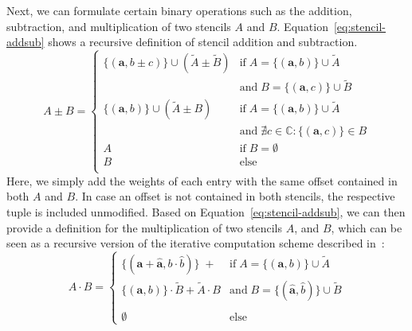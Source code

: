 Next, we can formulate certain binary operations such as the addition, subtraction, and multiplication of two stencils $A$ and $B$.
Equation~\eqref{eq:stencil-addsub} shows a recursive definition of stencil addition and subtraction.
\begin{equation}
	A \pm B = 
	\begin{cases}
		\{(\bm{a}, b\pm c ) \} \cup (\tilde{A} \pm \tilde{B}) & \text{if} \; A = 	\{(\bm{a}, b ) \} \cup \tilde{A} \\
		& \text{and} \; B = \{(\bm{a}, c ) \} \cup \tilde{B} \\
		
		\{(\bm{a}, b ) \} \cup (\tilde{A} \pm B) & \text{if} \; A = 	\{(\bm{a}, b ) \} \cup \tilde{A} \\
		& \text{and} \; \nexists  c \in \mathbb{C} : \{(\bm{a}, c ) \} \in B 
		\\
		A & \text{if} \; B = \emptyset
		\\
		B & \text{else} 
		\\
	\end{cases}
\label{eq:stencil-addsub}
\end{equation}
Here, we simply add the weights of each entry with the same offset contained in both $A$ and $B$.
In case an offset is not contained in both stencils, the respective tuple is included unmodified.  
Based on Equation~\eqref{eq:stencil-addsub}, we can then provide a definition for the multiplication of two stencils $A$, and $B$, which can be seen as a recursive version of the iterative computation scheme described in~\cite{rittich2018extending}:
\begin{equation}
	A \cdot B = 
	\begin{cases}
		\{(\bm{a} + \bm{\hat{a}}, b \cdot \hat{b} ) \} \; + & \text{if} \; A = \{(\bm{a}, b ) \} \cup \tilde{A} \\
		\{(\bm{a}, b ) \} \cdot \tilde{B} + \tilde{A} \cdot B & 
		\text{and} \; B = \{(\bm{\hat{a}}, \hat{b} ) \} \cup \tilde{B} \\ & \\
		\emptyset & \text{else} %
	\end{cases}
\label{eq:stencil-mult}
\end{equation}
